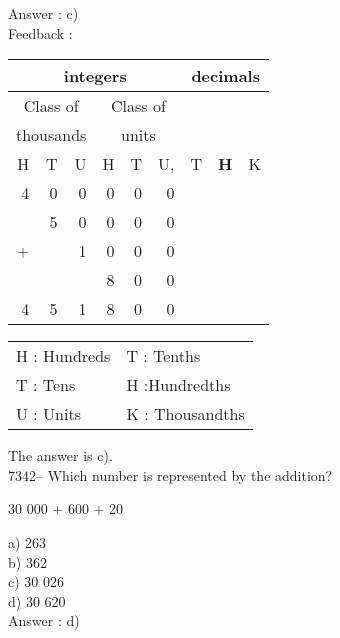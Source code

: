 \documentclass[letterpaper, 12pt]{article}
\begin{document}
Answer : c)\\

Feedback :\\
\begin{center}
\begin{tabular}{|rrr|rrr|rrr|}
\hline
\multicolumn{6}{|c|}{integers} &\multicolumn{3}{|c|}{decimals} \\
\hline
\multicolumn{3}{|c|}{Class of} &\multicolumn{3}{|c|}{Class of} &  \multicolumn{3}{c|}{} \\
\multicolumn{3}{|c|}{thousands} &\multicolumn{3}{|c|}{units} &  \multicolumn{3}{c|}{} \\
\hline
H & T & U &H & T & U, & T\up{th} & \textbf{H\up{th}} & K\up{th} \\
\hline
\hline
4 & 0 & 0 & 0 & 0 & 0 & & &\\
  & 5 & 0 & 0 & 0 & 0 & & &\\
+ &   & 1 & 0 & 0 & 0 & & &\\
  &   &   & 8 & 0 & 0 & & &\\
\hline
\hline
4 & 5 & 1 & 8 & 0 & 0 & & &\\
\hline
\end{tabular}
\end{center}

\scriptsize
\begin{center}
\begin{tabular}{ll}
H : Hundreds & T\up{th} : Tenths\\
T : Tens & H\up{th} :Hundredths\\
U : Units & K\up{e} : Thousandths\\
\end{tabular}
\end{center}

\normalsize
The answer is c).\\


7342-- Which number is represented by the addition?\\
\begin{center}
30 000 + 600 + 20
\end{center}

a) 263\\
b) 362\\
c) 30 026\\
d) 30 620\\

Answer : d)\\
\end{document}
